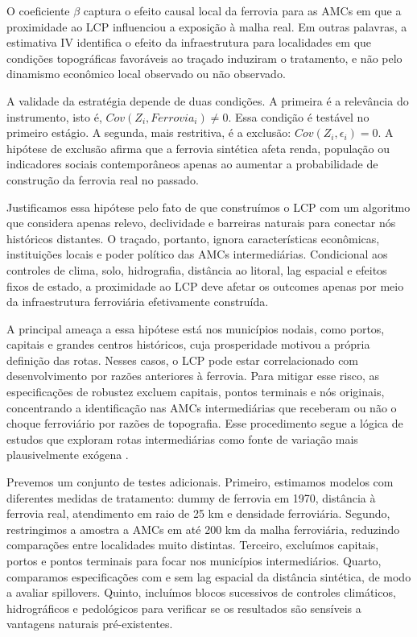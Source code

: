 \documentclass[12pt,a4paper]{article}
\begin{document}
\noindent O coeficiente $\beta$ captura o efeito causal local da ferrovia para as AMCs em que a proximidade ao LCP influenciou a exposição à malha real. Em outras palavras, a estimativa IV identifica o efeito da infraestrutura para localidades em que condições topográficas favoráveis ao traçado induziram o tratamento, e não pelo dinamismo econômico local observado ou não observado.


A validade da estratégia depende de duas condições. A primeira é a relevância do instrumento, isto é, $Cov(Z_i,Ferrovia_i) \neq 0$. Essa condição é testável no primeiro estágio. A segunda, mais restritiva, é a exclusão: $Cov(Z_i,\epsilon_i)=0$. A hipótese de exclusão afirma que a ferrovia sintética afeta renda, população ou indicadores sociais contemporâneos apenas ao aumentar a probabilidade de construção da ferrovia real no passado.

Justificamos essa hipótese pelo fato de que construímos o LCP com um algoritmo que considera apenas relevo, declividade e barreiras naturais para conectar nós históricos distantes. O traçado, portanto, ignora características econômicas, instituições locais e poder político das AMCs intermediárias. Condicional aos controles de clima, solo, hidrografia, distância ao litoral, lag espacial e efeitos fixos de estado, a proximidade ao LCP deve afetar os outcomes apenas por meio da infraestrutura ferroviária efetivamente construída.

A principal ameaça a essa hipótese está nos municípios nodais, como portos, capitais e grandes centros históricos, cuja prosperidade motivou a própria definição das rotas. Nesses casos, o LCP pode estar correlacionado com desenvolvimento por razões anteriores à ferrovia. Para mitigar esse risco, as especificações de robustez excluem capitais, pontos terminais e nós originais, concentrando a identificação nas AMCs intermediárias que receberam ou não o choque ferroviário por razões de topografia. Esse procedimento segue a lógica de estudos que exploram rotas intermediárias como fonte de variação mais plausivelmente exógena \citep{jedwab2016,berger2017}.


Prevemos um conjunto de testes adicionais. Primeiro, estimamos modelos com diferentes medidas de tratamento: dummy de ferrovia em 1970, distância à ferrovia real, atendimento em raio de 25 km e densidade ferroviária. Segundo, restringimos a amostra a AMCs em até 200 km da malha ferroviária, reduzindo comparações entre localidades muito distintas. Terceiro, excluímos capitais, portos e pontos terminais para focar nos municípios intermediários. Quarto, comparamos especificações com e sem lag espacial da distância sintética, de modo a avaliar spillovers. Quinto, incluímos blocos sucessivos de controles climáticos, hidrográficos e pedológicos para verificar se os resultados são sensíveis a vantagens naturais pré-existentes.
\end{document}
